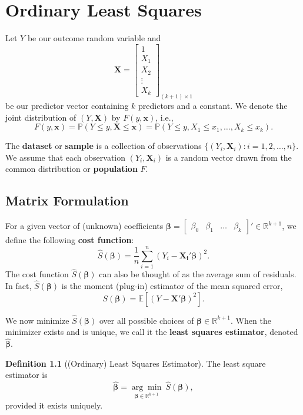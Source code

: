 \documentclass[
]{book}
\theoremstyle{definition}
\newtheorem{definition}{Definition}[chapter]
\theoremstyle{definition}
\theoremstyle{definition}
\theoremstyle{definition}
\theoremstyle{remark}
\begin{document}
\hypertarget{ordinary-least-squares}{%
\chapter{Ordinary Least Squares}\label{ordinary-least-squares}}

Let \(Y\) be our outcome random variable and
\[
\pmb{X}=\begin{bmatrix}
1 \\ X_1 \\ X_2 \\ \vdots \\ X_k
\end{bmatrix}_{(k+1)\times 1}
\]
be our predictor vector containing \(k\) predictors and a constant. We denote the joint distribution of \((Y,\pmb{X})\) by \(F(y,\pmb{x})\), i.e.,
\[
F(y,\pmb{x})=\mathbb{P}(Y\leq y, \pmb{X}\leq\pmb{x})
=\mathbb{P}(Y\leq y,X_1\leq x_1,\ldots,X_k\leq x_k).
\]

The \textbf{dataset} or \textbf{sample} is a collection of observations \(\{(Y_i,\pmb{X}_i): i=1,2,\ldots,n\}\). We assume that each observation
\((Y_i,\pmb{X}_i)\) is a random vector drawn from the common distribution or \textbf{population} \(F\).

\hypertarget{matrix-formulation}{%
\section{Matrix Formulation}\label{matrix-formulation}}

For a given vector of (unknown) coefficients
\(\pmb{\beta}=\begin{bmatrix}\beta_0 & \beta_1 & \ldots & \beta_k\end{bmatrix}'\in\mathbb{R}^{k+1}\), we define the following \textbf{cost function}:
\[
\widehat{S}(\pmb{\beta})=\frac{1}{n}\sum\limits_{i=1}^n(Y_i-\pmb{X_i}'\pmb{\beta})^2.
\]
The cost function \(\widehat{S}({\pmb{\beta}})\) can also be thought of as the average sum of residuals. In fact, \(\widehat{S}({\pmb{\beta}})\) is the moment (plug-in) estimator of the mean squared error,
\[
S(\pmb{\beta})={\mathbb{E}\left[ (Y-\pmb{X}'\pmb{\beta})^2 \right]}.
\]

We now minimize \(\widehat{S}({\pmb{\beta}})\) over all possible choices of
\(\pmb{\beta}\in\mathbb{R}^{k+1}\). When the minimizer exists and is unique, we call it the \textbf{least squares estimator}, denoted \(\widehat{\pmb{\beta}}\).

\begin{definition}[(Ordinary) Least Squares Estimator]
The least square estimator is \[
\widehat{\pmb{\beta}}
=\underset{\pmb{\beta}\in\mathbb{R}^{k+1}}{\arg\min} \ \widehat{S}(\pmb{\beta}),
\]
provided it exists uniquely.
\end{definition}
\end{document}
